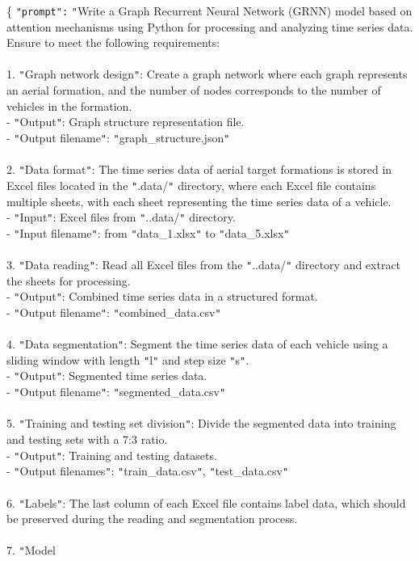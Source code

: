 \begin{tcolorbox}[colback=blue!5!white, colframe=blue!75!black, title=Hard-level Prompt:, text width=\textwidth]
\{ \texttt{"prompt":} \texttt{"}Write a Graph Recurrent Neural Network (GRNN) model based on attention mechanisms using Python for processing and analyzing time series data. Ensure to meet the following requirements:\\ \\1. \texttt{"}Graph network design\texttt{"}: Create a graph network where each graph represents an aerial formation, and the number of nodes corresponds to the number of vehicles in the formation.\\   - \texttt{"}Output\texttt{"}: Graph structure representation file.\\   - \texttt{"}Output filename\texttt{"}: \texttt{"}graph\_structure.json\texttt{"}\\ \\2. \texttt{"}Data format\texttt{"}: The time series data of aerial target formations is stored in Excel files located in the \texttt{"}.data/\texttt{"} directory, where each Excel file contains multiple sheets, with each sheet representing the time series data of a vehicle.\\   - \texttt{"}Input\texttt{"}: Excel files from \texttt{"}..data/\texttt{"} directory.\\   - \texttt{"}Input filename\texttt{"}: from \texttt{"}data\_1.xlsx\texttt{"} to \texttt{"}data\_5.xlsx\texttt{"}\\ \\3. \texttt{"}Data reading\texttt{"}: Read all Excel files from the \texttt{"}..data/\texttt{"} directory and extract the sheets for processing.\\   - \texttt{"}Output\texttt{"}: Combined time series data in a structured format.\\   - \texttt{"}Output filename\texttt{"}: \texttt{"}combined\_data.csv\texttt{"}\\ \\ 4. \texttt{"}Data segmentation\texttt{"}: Segment the time series data of each vehicle using a sliding window with length \texttt{"}l\texttt{"} and step size \texttt{"}s\texttt{"}.\\   - \texttt{"}Output\texttt{"}: Segmented time series data.\\   - \texttt{"}Output filename\texttt{"}: \texttt{"}segmented\_data.csv\texttt{"}\\\\5. \texttt{"}Training and testing set division\texttt{"}: Divide the segmented data into training and testing sets with a 7:3 ratio.\\   - \texttt{"}Output\texttt{"}: Training and testing datasets.\\   - \texttt{"}Output filenames\texttt{"}: \texttt{"}train\_data.csv\texttt{"}, \texttt{"}test\_data.csv\texttt{"} \\\\6. \texttt{"}Labels\texttt{"}: The last column of each Excel file contains label data, which should be preserved during the reading and segmentation process. \\\\7. \texttt{"}Model 
\end{tcolorbox}
